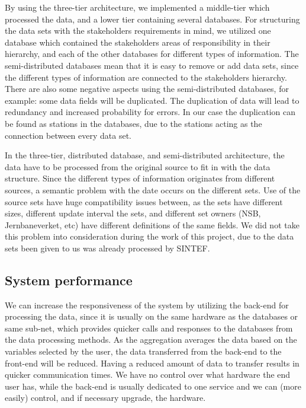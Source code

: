 By using the three-tier architecture, we implemented a middle-tier which 
processed the data, and a lower tier containing several databases. For
structuring the data sets with the stakeholders requirements in mind, we
utilized one database which contained the stakeholders areas of responsibility in
their hierarchy, and each of the other databases for different types of 
information. The semi-distributed databases mean that it is easy to remove or
add data sets, since the different types of information are connected to the
stakeholders hierarchy. There are also some negative aspects using
the semi-distributed databases, for example: some data fields
will be duplicated. The duplication of data will lead to redundancy and
increased probability for errors. In our case the duplication can be found as stations in the databases, due to the stations acting as the
connection between every data set. 

In the three-tier, distributed database, 
and semi-distributed architecture, the data have to be processed from the 
original source to fit in with the data structure. Since the different types of
information originates from different sources, a semantic problem with the date
occurs on the different sets. Use of the source sets have huge compatibility 
issues between, as the sets have different sizes, different update interval
the sets, and different set owners (NSB, Jernbaneverket, etc) have different
definitions of the same fields. We did not take this problem into consideration
during the work of this project, due to the data sets been given to us was 
already processed by SINTEF. 

\subsection{System performance} %
\label{sub:system_performance}
We can increase the responsiveness of the system by utilizing the back-end for 
processing the data, since it is usually on the same hardware as the databases or 
same sub-net, which provides quicker calls and responses to the databases from 
the data processing methods. As the aggregation averages the data based on the 
variables selected by the user, the data transferred from the back-end to the 
front-end will be reduced. Having a reduced amount of data to transfer results 
in quicker communication times. We 
have no control over what hardware the end user has, while the back-end 
is usually dedicated to one service and we can (more easily) control, and if 
necessary upgrade, the hardware.

